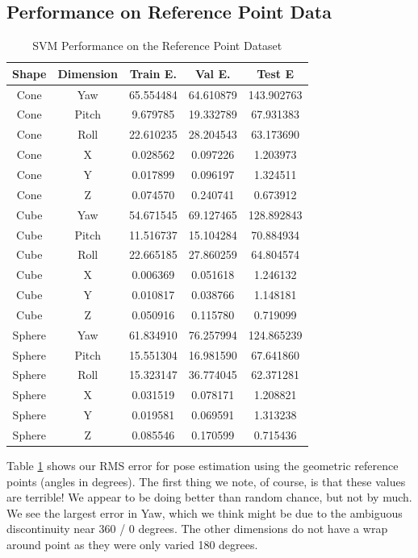 \documentclass[journal]{IEEEtran}
\begin{document}
\subsection{Performance on Reference Point Data}

\begin{table}[h]
\caption{SVM Performance on the Reference Point Dataset}
\label{SVM_Point}
\centering
	\begin{tabular}{|c|c|c|c|c|}
	\hline
	Shape & Dimension & Train E. & Val E. & Test E\\
   \hline
    Cone &Yaw & 65.554484 & 64.610879 & 143.902763 \\
    Cone &Pitch & 9.679785 & 19.332789 & 67.931383 \\
    Cone &Roll & 22.610235 & 28.204543 & 63.173690 \\
    Cone &X & 0.028562 & 0.097226 & 1.203973 \\
    Cone &Y & 0.017899 & 0.096197 & 1.324511 \\
    Cone &Z & 0.074570 & 0.240741 & 0.673912 \\
    \hline
    Cube & Yaw & 54.671545 & 69.127465 & 128.892843 \\
    Cube & Pitch & 11.516737 & 15.104284 & 70.884934 \\
    Cube & Roll & 22.665185 & 27.860259 & 64.804574 \\
    Cube & X & 0.006369 & 0.051618 & 1.246132 \\
    Cube & Y & 0.010817 & 0.038766 & 1.148181 \\
    Cube & Z & 0.050916 & 0.115780 & 0.719099 \\
    \hline
    Sphere & Yaw & 61.834910 & 76.257994 & 124.865239 \\
    Sphere & Pitch & 15.551304 & 16.981590 & 67.641860 \\
    Sphere & Roll & 15.323147 & 36.774045 & 62.371281 \\
    Sphere & X & 0.031519 & 0.078171 & 1.208821 \\
    Sphere & Y & 0.019581 & 0.069591 & 1.313238 \\
    Sphere & Z & 0.085546 & 0.170599 & 0.715436\\
    \hline
	\end{tabular}
\end{table}

Table \ref{SVM_Point} shows our RMS error for pose estimation using the geometric reference points (angles in degrees). The first thing we note, of course, is that these values are terrible! We appear to be doing better than random chance, but not by much. We see the largest error in Yaw, which we think might be due to the ambiguous discontinuity near 360 / 0 degrees. The other dimensions do not have a wrap around point as they were only varied 180 degrees.
\end{document}
